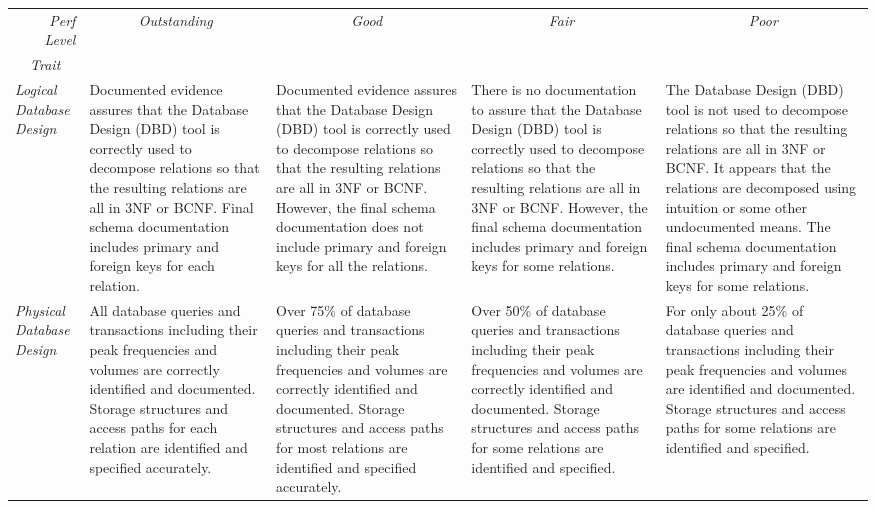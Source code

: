 \documentclass[11pt]{article}
\begin{document}
\begin{landscape}
\begin{tabular}{p{1.2in}p{1.5in}p{1.5in}p{1.5in}p{1.5in}}
\end{tabular}


\newpage

\begin{tabular}{p{1.2in}p{1.5in}p{1.5in}p{1.5in}p{1.5in}} \toprule
\multicolumn{1}{r}{\emph{Perf Level}} & \multicolumn{1}{c}{\emph{Outstanding}} & \multicolumn{1}{c}{\emph{Good}} & \multicolumn{1}{c}{\emph{Fair}} & \multicolumn{1}{c}{\emph{Poor}} \\ 
\multicolumn{1}{c}{\emph{Trait}} & & & & \\ \midrule

\emph{Logical Database Design} &

Documented evidence assures that the Database Design (DBD) tool is correctly used to decompose relations so that the resulting relations are all in 3NF or BCNF. Final schema documentation includes primary and foreign keys for each relation. &
Documented evidence assures that the Database Design (DBD) tool is correctly used to decompose relations so that the resulting relations are all in 3NF or BCNF. However, the final schema documentation does not include primary and foreign keys for all the relations. &
There is no documentation to assure that the Database Design (DBD) tool is correctly used to decompose relations so that the resulting relations are all in 3NF or BCNF. However, the final schema documentation includes primary and foreign keys for some relations. &
The Database Design (DBD) tool is not used to decompose relations so that the resulting relations are all in 3NF or BCNF. It appears that the relations are decomposed using intuition or some other undocumented means. The final schema documentation includes primary and foreign keys for some relations. \\ \midrule

\emph{Physical Database Design} & 
All database queries and transactions including their peak frequencies and volumes are correctly identified and documented. Storage structures and access paths for each relation are identified and specified accurately. &
Over 75\% of database queries and transactions including their peak frequencies and volumes are correctly identified and documented. Storage structures and access paths for most relations are identified and specified accurately. &
Over 50\% of database queries and transactions including their peak frequencies and volumes are correctly identified and documented. Storage structures and access paths for some relations are identified and specified. &
For only about 25\% of database queries and transactions including their peak frequencies and volumes are  identified and documented. Storage structures and access paths for some relations are identified and specified. \\ \bottomrule 

\end{tabular}


\end{landscape}
\end{document}
